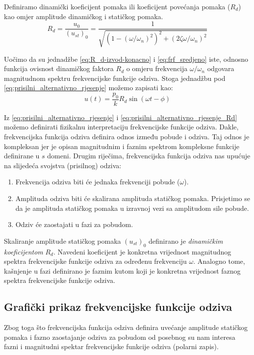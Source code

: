 Definiramo dinamički koeficijent pomaka ili koeficijent povećanja pomaka ($R_d$) kao omjer
amplitude dinamičkog i statičkog pomaka.
\begin{equation}\label{eq:R_d-izvod-konacno}
    R_d = \frac{u_0}{(u_{st})_0}=\frac{1}{\sqrt{(1-(\omega/\omega_n)^2)^2+(2\zeta\omega/\omega_n)^2}}
\end{equation}

Uočimo da su jednadžbe \eqref{eq:R_d-izvod-konacno} i \eqref{eq:frf_sredjeno} iste,
odnosno funkcija ovisnost dinamičkog faktora $R_d$ o omjeru frekvencija
$\omega/\omega_n$ odgovara magnitudnom spektru frekvencijske funkcije odziva. Stoga
jednadžbu pod \eqref{eq:prisilni_alternativno_rjesenje} možemo zapisati kao:
\begin{equation}\label{eq:prisilni_alternativno_rjesenje_Rd}
    u(t)=\frac{p_0}{k}R_d\sin(\omega t - \phi)
\end{equation}

Iz \eqref{eq:prisilni_alternativno_rjesenje} i \eqref{eq:prisilni_alternativno_rjesenje_Rd}
možemo definirati fizikalnu interpretaciju frekvencijske funkcije odziva.
Dakle, frekvencijska funkcija odziva definira odnos između pobude i
odziva. Taj odnos je kompleksan jer je opisan magnitudnim i faznim spektrom
kompleksne funkcije definirane u $s$ domeni. Drugim riječima, frekvencijska funkcija
odziva nas upućuje na slijedeća svojstva (prisilnog) odziva:
\begin{enumerate}
    \item Frekvencija odziva biti će jednaka frekvenciji pobude ($\omega$).
    \item Amplituda odziva biti će skalirana amplituda statičkog pomaka. Prisjetimo
        se da je amplituda statičkog pomaka u izravnoj vezi sa amplitudom sile pobude.
    \item Odziv će zaostajati u fazi za pobudom. 
\end{enumerate}

Skaliranje amplitude statičkog pomaka $(u_{st})_0$ definirano je \textit{dinamičkim
koeficijentom} $R_d$. Navedeni koeficijent je konkretna vrijednost magnitudnog
spektra frekvencijske funkcije odziva za određenu frekvenciju $\omega$. Analogno
tome, kašnjenje u fazi definirano je faznim kutom koji je konkretna vrijednost
faznog spektra frekvencijske funkcije odziva.

\subsection{Grafički prikaz frekvencijske funkcije odziva}
Zbog toga što frekvencijska funkcija odziva definira uvećanje amplitude statičkog
pomaka i fazno zaostajanje odziva za pobudom od posebnog su nam interesa fazni i
magnitudni spektar frekvencijske funkcije odziva (polarni zapis).
\par

